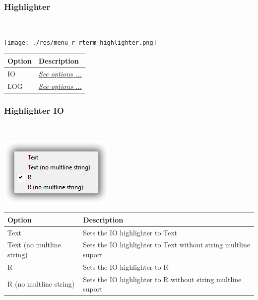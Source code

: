 \newpage
\hypertarget{menu_view_r_rterm_highlighter}{}
\subsubsection{Highlighter}\\

\texttt{[image: ./res/menu\_r\_rterm\_highlighter.png]}\\

\begin{scriptsize}
  \begin{tabularx}{\textwidth}{>{\hsize=0.3\hsize}X>{\hsize=0.7\hsize}X}\\
    \hline
    \textbf{Option} & \textbf{Description} \\
    \hline
    IO & \textit{\href{\#menu\_r\_rterm\_highlighter\_IO}{See options ...}} \\
    LOG & \textit{\href{\#menu\_r\_rterm\_highlighter\_Log}{See options ...}} \\
    \hline
  \end{tabularx}
\end{scriptsize}


\hypertarget{menu_view_r_rterm_highlighter_IO}{}
\subsubsection{Highlighter IO}\\

\includegraphics[scale=0.50]{./res/menu_r_rterm_highlighter_io.png}\\

\begin{scriptsize}
  \begin{tabularx}{\textwidth}{>{\hsize=0.3\hsize}X>{\hsize=0.7\hsize}X}\\
    \hline
    \textbf{Option} & \textbf{Description} \\
    \hline
    Text & Sets the IO highlighter to Text \\
    Text (no multline string) & Sets the IO highlighter to Text without string multline suport \\
    R & Sets the IO highlighter to R \\
    R (no multline string) & Sets the IO highlighter to R without string multline suport \\
    \hline
  \end{tabularx}
\end{scriptsize}


